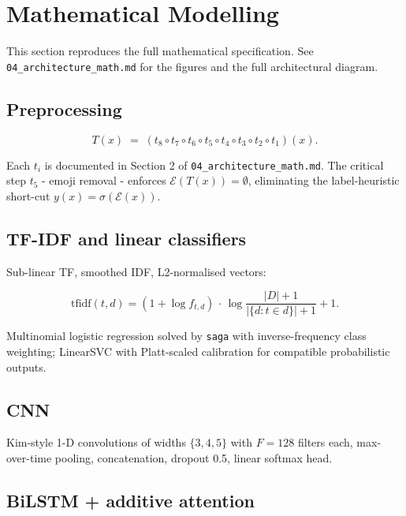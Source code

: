 \documentclass[
  english,
  11pt,
]{article}
\begin{document}
\newpage

\section{Mathematical Modelling}\label{mathematical-modelling}

This section reproduces the full mathematical specification. See
\texttt{04\_architecture\_math.md} for the figures and the full
architectural diagram.

\subsection{Preprocessing}\label{preprocessing}

\[
T(x) \;=\; (t_8 \circ t_7 \circ t_6 \circ t_5 \circ t_4 \circ t_3 \circ t_2 \circ t_1)(x).
\]

Each \(t_i\) is documented in Section 2 of
\texttt{04\_architecture\_math.md}. The critical step \(t_5\) - emoji
removal - enforces \(\mathcal{E}(T(x)) = \emptyset\), eliminating the
label-heuristic short-cut \(y(x) = \sigma(\mathcal{E}(x))\).

\subsection{TF-IDF and linear
classifiers}\label{tf-idf-and-linear-classifiers}

Sub-linear TF, smoothed IDF, L2-normalised vectors:

\[
\text{tfidf}(t,d) = (1+\log f_{t,d})\,\cdot\, \log\!\frac{|D|+1}{|\{d:t\in d\}|+1} + 1.
\]

Multinomial logistic regression solved by \texttt{saga} with
inverse-frequency class weighting; LinearSVC with Platt-scaled
calibration for compatible probabilistic outputs.

\subsection{CNN}\label{cnn}

Kim-style 1-D convolutions of widths \(\{3,4,5\}\) with \(F = 128\)
filters each, max-over-time pooling, concatenation, dropout 0.5, linear
softmax head.

\subsection{BiLSTM + additive
attention}\label{bilstm-additive-attention}
\end{document}
